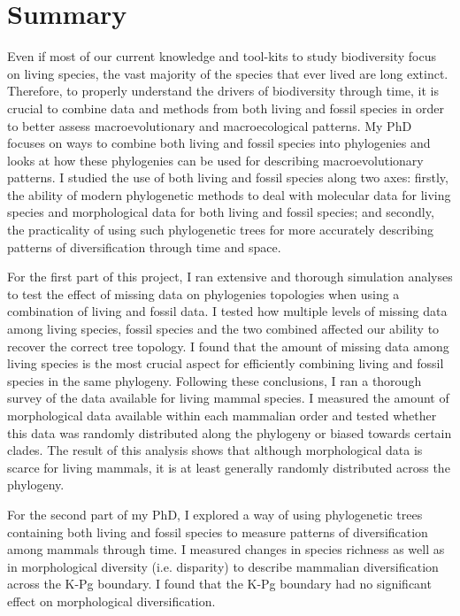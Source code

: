 \chapter*{Summary}

Even if most of our current knowledge and tool-kits to study biodiversity focus on living species, the vast majority of the species that ever lived are long extinct.
Therefore, to properly understand the drivers of biodiversity through time, it is crucial to combine data and methods from both living and fossil species in order to better assess macroevolutionary and macroecological patterns.
My PhD focuses on ways to combine both living and fossil species into phylogenies and looks at how these phylogenies can be used for describing macroevolutionary patterns.
I studied the use of both living and fossil species along two axes: firstly, the ability of modern phylogenetic methods to deal with molecular data for living species and morphological data for both living and fossil species; and secondly, the practicality of using such phylogenetic trees for more accurately describing patterns of diversification through time and space.

For the first part of this project, I ran extensive and thorough simulation analyses to test the effect of missing data on phylogenies topologies when using a combination of living and fossil data.
I tested how multiple levels of missing data among living species, fossil species and the two combined affected our ability to recover the correct tree topology.
I found that the amount of missing data among living species is the most crucial aspect for efficiently combining living and fossil species in the same phylogeny.
Following these conclusions, I ran a thorough survey of the data available for living mammal species.
I measured the amount of morphological data available within each mammalian order and tested whether this data was randomly distributed along the phylogeny or biased towards certain clades.
The result of this analysis shows that although morphological data is scarce for living mammals, it is at least generally randomly distributed across the phylogeny.

For the second part of my PhD, I explored a way of using phylogenetic trees containing both living and fossil species to measure patterns of diversification among mammals through time.
I measured changes in species richness as well as in morphological diversity (i.e. disparity) to describe mammalian diversification across the K-Pg boundary.
I found that the K-Pg boundary had no significant effect on morphological diversification.
